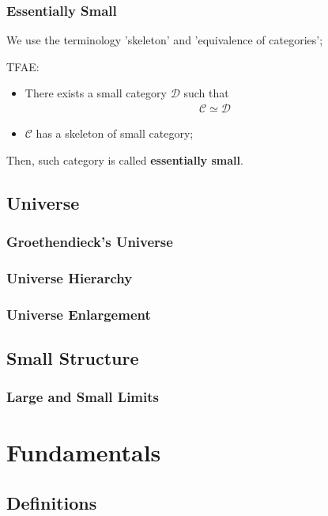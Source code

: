 \documentclass[Total.tex]{subfiles}
\begin{document}
			\subsection{Essentially Small}
				\begin{Def}
					We use the terminology 'skeleton' and 'equivalence of categories';
					
					TFAE:
					\begin{itemize}
						\item There exists a small category $\mathcal{D}$ such that
						\begin{gather*}
							\mathcal{C}\simeq \mathcal{D}
						\end{gather*}
						\item $\mathcal{C}$ has a skeleton of small category;
					\end{itemize}
					
					Then, such category is called \textbf{essentially small}.
				\end{Def}
		\section{Universe}
		\subsection{Groethendieck's Universe}
		\subsection{Universe Hierarchy}
		\subsection{Universe Enlargement}
		\section{Small Structure}
		\subsection{Large and Small Limits}
	\chapter{Fundamentals}
		\section{Definitions}
		
\end{document}
